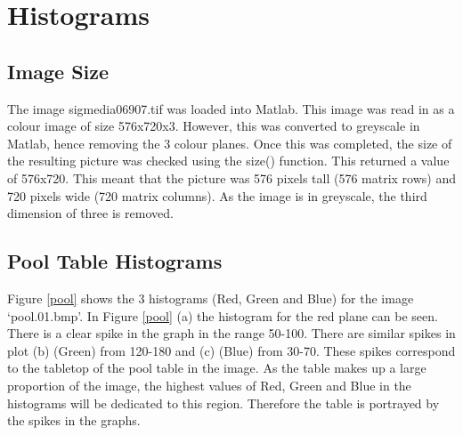 \documentclass[11pt]{article}
\begin{document}

\section{Histograms}

\subsection{Image Size}
The image sigmedia06907.tif was loaded into Matlab. This image was read in as a colour image of size 576x720x3. However, this was converted to greyscale in Matlab, hence removing the 3 colour planes. Once this was completed, the size of the resulting picture was checked using the size() function. This returned a value of 576x720. This meant that the picture was 576 pixels tall (576 matrix rows) and 720 pixels wide (720 matrix columns). As the image is in greyscale, the third dimension of three is removed.

\subsection{Pool Table Histograms}
Figure \ref{pool} shows the 3 histograms (Red, Green and Blue) for the image `pool.01.bmp'. In Figure \ref{pool} (a) the histogram for the red plane can be seen. There is a clear spike in the graph in the range 50-100. There are similar spikes in plot (b) (Green) from 120-180 and (c) (Blue) from 30-70. These spikes correspond to the tabletop of the pool table in the image. As the table makes up a large proportion of the image, the highest values of Red, Green and Blue in the histograms will be dedicated to this region. Therefore the table is portrayed by the spikes in the graphs. 
\end{document}
